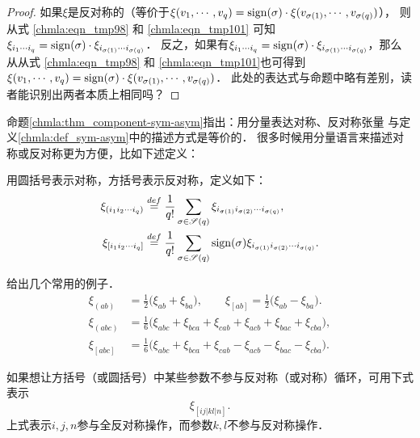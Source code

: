 \begin{proof}
    如果$\xi$是反对称的（等价于$\xi(v_1,\cdots,v_q)=
       {\rm sign}(\sigma) \cdot \xi( v_{\sigma(1)},\cdots, v_{\sigma(q)})$），
    则从式 \eqref{chmla:eqn_tmp98} 和 \eqref{chmla:eqn_tmp101}
    可知$\xi_{i_1 \cdots i_q}= {\rm sign}(\sigma) \cdot \xi_{i_{\sigma(1)} \cdots i_{\sigma(q)}}$．
    反之，如果有$\xi_{i_1 \cdots i_q}={\rm sign}(\sigma) \cdot \xi_{i_{\sigma(1)} \cdots i_{\sigma(q)}}$，那么
    从从式 \eqref{chmla:eqn_tmp98} 和 \eqref{chmla:eqn_tmp101}也可得到
    $\xi(v_1,\cdots,v_q)={\rm sign}(\sigma) \cdot\xi( v_{\sigma(1)},\cdots, v_{\sigma(q)})$．
    此处的表达式与命题中略有差别，读者能识别出两者本质上相同吗？
\end{proof}

命题\ref{chmla:thm_component-sym-asym}指出：用分量表达对称、反对称张量
与定义\ref{chmla:def_sym-asym}中的描述方式是等价的．
很多时候用分量语言来描述对称或反对称更为方便，比如下述定义：

\begin{definition}\label{chmla:def_sym-antis}
    用圆括号表示对称，方括号表示反对称，定义如下：
    \begin{align}
        \xi_{(i_1 i_2 \cdots i_q)}& \overset{def}{=} \frac{1}{q!}
        \sum_{\sigma\in \mathscr{S}(q)} \xi_{i_{\sigma(1)} i_{\sigma(2)} \cdots i_{\sigma(q)}}, \\
        \xi_{[i_1 i_2 \cdots i_q]}& \overset{def}{=} \frac{1}{q!}
        \sum_{\sigma\in \mathscr{S}(q)}{\rm sign}(\sigma) \xi_{i_{\sigma(1)} i_{\sigma(2)} \cdots i_{\sigma(q)}}.
    \end{align}
\end{definition}
给出几个常用的例子．
\begin{align}
    \xi_{(ab)} & {=} \frac{1}{2} \bigl(\xi_{ab} + \xi_{ba} \bigr), \qquad
    \xi_{[ab]}   {=} \frac{1}{2} \bigl(\xi_{ab} - \xi_{ba} \bigr). \\
    \xi_{(abc)}& {=} \frac{1}{6} \bigl(\xi_{abc} + \xi_{bca} + \xi_{cab} + \xi_{acb} + \xi_{bac} + \xi_{cba} \bigr), \label{chmla:eqn_tmp590} \\
    \xi_{[abc]}& {=} \frac{1}{6} \bigl(\xi_{abc} + \xi_{bca} + \xi_{cab} - \xi_{acb} - \xi_{bac} - \xi_{cba} \bigr) .\label{chmla:eqn_tmp592}
\end{align}

如果想让方括号（或圆括号）中某些参数不参与反对称（或对称）循环，可用下式表示
\begin{equation}
    \xi_{[ij|kl|n]}.
\end{equation}
上式表示$i,j,n$参与全反对称操作，而参数$k,l$不参与反对称操作．

